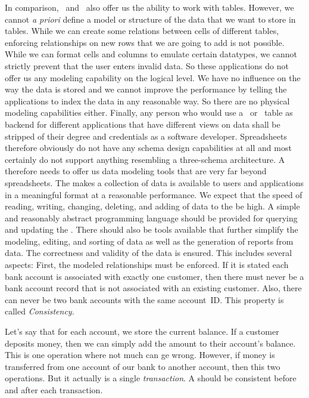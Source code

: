 In comparison, \microsoftExcel\ and \libreofficeCalc\ also offer us the ability to work with tables.
However, we cannot \emph{a priori} define a model or structure of the data that we want to store in tables.
While we can create some relations between cells of different tables, enforcing relationships on new rows that we are going to add is not possible.
While we can format cells and columns to emulate certain datatypes, we cannot strictly prevent that the user enters invalid data.
So these applications do not offer us any modeling capability on the logical level.
We have no influence on the way the data is stored and we cannot improve the performance by telling the applications to index the data in any reasonable way.
So there are no physical modeling capabilities either.
Finally, any person who would use a \microsoftExcel\ or \libreofficeCalc\ table as backend for different applications that have different views on data shall be stripped of their degree and credentials as a software developer.
Spreadsheets therefore obviously do not have any schema design capabilities at all and most certainly do not support anything resembling a three-schema architecture.
A  therefore needs to offer us data modeling tools that are very far beyond spreadsheets.%
\endhsection%
%
The  makes a collection of data is available to users and applications in a meaningful format at a reasonable performance.
We expect that the speed of reading, writing, changing, deleting, and adding of data to the  be high.
A simple and reasonably abstract programming language should be provided for querying and updating the .
There should also be tools available that further simplify the modeling, editing, and sorting of data as well as the generation of reports from data.%
\endhsection%
%
%
The correctness and validity of the data is ensured.
This includes several aspects:
First, the modeled relationships must be enforced.
If it is stated each bank account is associated with exactly one customer, then there must never be a bank account record that is not associated with an existing customer.
Also, there can never be two bank accounts with the same account~ID.
This property is called \emph{Consistency}.

Let's say that for each account, we store the current balance.
If a customer deposits money, then we can simply add the amount to their account's balance.
This is one operation where not much can ge wrong.
However, if money is transferred from one account of our bank to another account, then this  two operations.
But it actually is a single \emph{transaction}.
A  should be consistent before and after each transaction.

